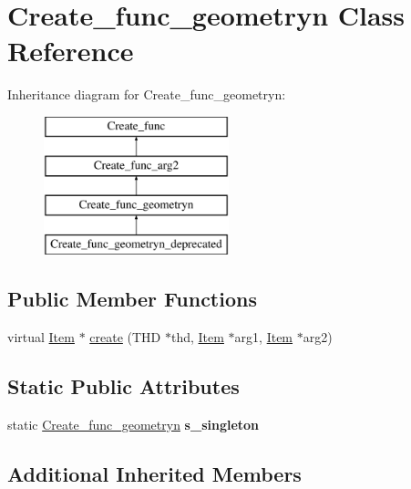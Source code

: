 \hypertarget{classCreate__func__geometryn}{}\section{Create\+\_\+func\+\_\+geometryn Class Reference}
\label{classCreate__func__geometryn}
Inheritance diagram for Create\+\_\+func\+\_\+geometryn\+:\begin{figure}[H]
\begin{center}
\leavevmode
\includegraphics[height=4.000000cm]{classCreate__func__geometryn}
\end{center}
\end{figure}
\subsection*{Public Member Functions}
\begin{DoxyCompactItemize}
\item 
virtual \mbox{\hyperlink{classItem}{Item}} $\ast$ \mbox{\hyperlink{classCreate__func__geometryn_a01cb7ffec38e4cdef3a6011199b0b47d}{create}} (T\+HD $\ast$thd, \mbox{\hyperlink{classItem}{Item}} $\ast$arg1, \mbox{\hyperlink{classItem}{Item}} $\ast$arg2)
\end{DoxyCompactItemize}
\subsection*{Static Public Attributes}
\begin{DoxyCompactItemize}
\item 
\mbox{\label{classCreate__func__geometryn_a940758c62695963a4d9fbc1ea0f5ed86}} 
static \mbox{\hyperlink{classCreate__func__geometryn}{Create\+\_\+func\+\_\+geometryn}} {\bfseries s\+\_\+singleton}
\end{DoxyCompactItemize}
\subsection*{Additional Inherited Members}


